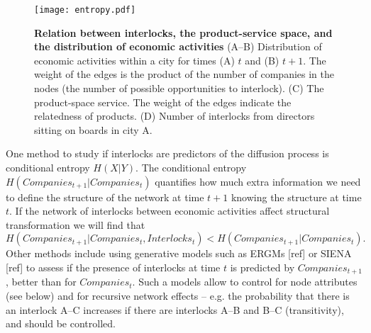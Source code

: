 \begin{figure}
\begin{center}
\texttt{[image: entropy.pdf]}
\caption{\textbf{Relation between interlocks, the product-service space, and the distribution of economic activities} (A--B) Distribution of economic activities within a city for times (A) $t$ and (B) $t+1$. The weight of the edges is the product of the number of companies in the nodes (the number of possible opportunities to interlock). (C) The product-space service. The weight of the edges indicate the relatedness of products. (D) Number of interlocks from directors sitting on boards in city A.}
\label{fig:entropy}
\end{center}
\end{figure}

One method to study if interlocks are predictors of the diffusion process is conditional entropy $H(X|Y)$.
The conditional entropy  $H(Companies_{t+1}|Companies_{t})$ quantifies how much extra information we need to define the structure of the network at time $t+1$ knowing the structure at time $t$. 
If the network of interlocks between economic activities affect structural transformation we will find that 
$$H(Companies_{t+1}|Companies_{t},Interlocks_{t}) < H(Companies_{t+1}|Companies_{t}).$$
Other methods include using generative models such as ERGMs [ref] or SIENA [ref] to assess if the presence of interlocks at time $t$ is predicted by $Companies_{t+1}$,
better than for $Companies_{t}$.
Such a models allow to control for node attributes (see below) and for recursive network effects 
-- e.g. the probability that there is an interlock A--C increases if there are interlocks A--B and B--C (transitivity), and should be controlled.

